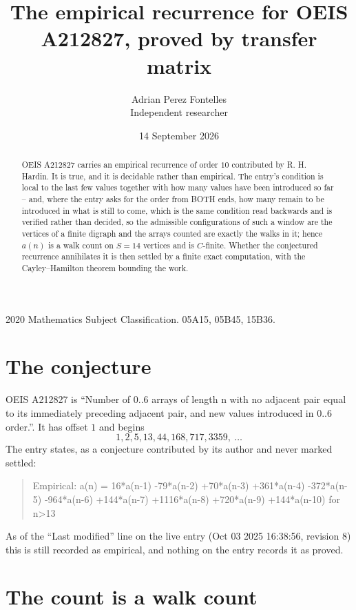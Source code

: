 \documentclass[11pt,a4paper]{article}
\title{The empirical recurrence for OEIS A212827, proved by transfer matrix}
\author{Adrian Perez Fontelles\\ \small Independent researcher}
\date{14 September 2026}
\theoremstyle{plain}
\theoremstyle{definition}
\begin{document}
\maketitle

\begin{abstract}
OEIS A212827 carries an empirical recurrence of order $10$ contributed by R. H. Hardin. It is
true, and it is decidable rather than empirical. The entry's condition is local to the last few values together with how many values have been introduced so far -- and, where the entry asks for the order from BOTH ends, how many remain to be introduced in what is still to come, which is the same condition read backwards and is verified rather than decided, so
the admissible configurations of such a window are the vertices of a finite digraph and the
arrays counted are exactly the walks in it; hence $a(n)$ is a walk count on $S=14$ vertices
and is $C$-finite. Whether the conjectured recurrence annihilates it is then settled by a
finite exact computation, with the Cayley--Hamilton theorem bounding the work.
\end{abstract}

\noindent\small 2020 Mathematics Subject Classification. 05A15, 05B45, 15B36.\normalsize

\section{The conjecture}

OEIS A212827 is ``Number of 0..6 arrays of length n with no adjacent pair equal to its immediately preceding adjacent pair, and new values introduced in 0..6 order.''. It has offset $1$ and begins
\[
1, 2, 5, 13, 44, 168, 717, 3359,\ \dots
\]
The entry states, as a conjecture contributed by its author and never marked settled:
\begin{quote}
Empirical: a(n) = 16*a(n-1) -79*a(n-2) +70*a(n-3) +361*a(n-4) -372*a(n-5) -964*a(n-6) +144*a(n-7) +1116*a(n-8) +720*a(n-9) +144*a(n-10) for n>13
\end{quote}
As of the ``Last modified'' line on the live entry (Oct 03 2025 16:38:56, revision 8) this is still
recorded as empirical, and nothing on the entry records it as proved.

\section{The count is a walk count}
\end{document}
